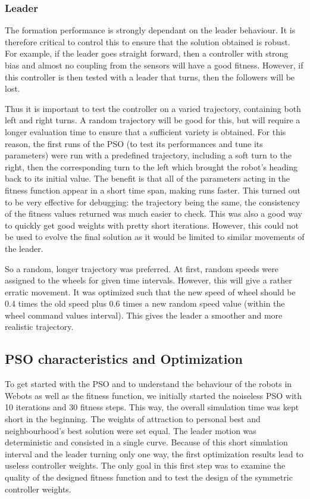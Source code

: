 \documentclass[a4paper, 10pt, conference]{ieeeconf}      %
\begin{document}
\subsubsection{Leader}
The formation performance is strongly dependant on the leader behaviour. It is therefore critical to control this to ensure that the solution obtained is robust. For example, if the leader goes straight forward, then a controller with strong bias and almost no coupling from the sensors will have a good fitness. However, if this controller is then tested with a leader that turns, then the followers will be lost. 

Thus it is important to test the controller on a varied trajectory, containing both left and right turns. A random trajectory will be good for this, but will require a longer evaluation time to ensure that a sufficient variety is obtained. For this reason, the first runs of the PSO (to test its performances and tune its parameters) were run with a predefined trajectory, including a soft turn to the right, then the corresponding turn to the left which brought the robot's heading back to its initial value. The benefit is that all of the parameters acting in the fitness function appear in a short time span, making runs faster. This turned out to be very effective for debugging: the trajectory being the same, the consistency of the fitness values returned was much easier to check. This was also a good way to quickly get good weights with pretty short iterations. However, this could not be used to evolve the final solution as it would be limited to similar movements of the leader.

So a random, longer trajectory was preferred. At first, random speeds were assigned to the wheels for given time intervals. However, this will give a rather erratic movement. It was optimized such that the new speed of wheel should be 0.4 times the old speed plus 0.6 times a new random speed value (within the wheel command values interval). This gives the leader a smoother and more realistic trajectory.

\subsection{PSO characteristics and Optimization}

To get started with the PSO and to understand the behaviour of the robots in Webots as well as the fitness function, we initially started the noiseless PSO with 10 iterations and 30 fitness steps. This way, the overall simulation time was kept short in the beginning. The weights of attraction to personal best and neighbourhood's best solution were set equal. The leader motion was deterministic and consisted in a single curve.  Because of this short simulation interval and the leader turning only one way, the first optimization results lead to useless controller weights. The only goal in this first step was to examine the quality of the designed fitness function and to test the design of the symmetric controller weights.
\end{document}
